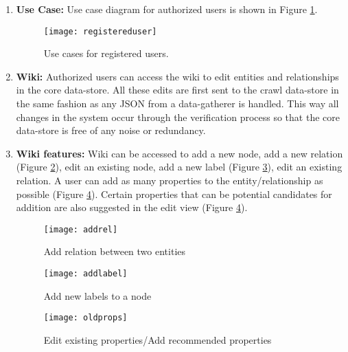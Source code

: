 \begin{enumerate}

\item \textbf{Use Case:} Use case diagram for authorized users is shown in Figure \ref{fig:registereduser}.

\begin{figure}[H]
\begin{center}  
\texttt{[image: registereduser]} 
\caption{Use cases for registered users.}
\label{fig:registereduser}
\end{center}
\end{figure}

\item \textbf{Wiki:} Authorized users can access the wiki to edit entities and relationships in the core data-store. All these edits are first sent to the crawl data-store in the same fashion as any JSON from a data-gatherer is handled. This way all changes in the system occur through the verification process so that the core data-store is free of any noise or redundancy. 


\item \textbf{Wiki features:} Wiki can be accessed to add a new node, add a  new relation (Figure \ref{fig:addrel}),  edit an existing node, add a new label (Figure \ref{fig:addlabel}), edit an existing relation. A user can add as many properties to the entity/relationship as possible (Figure \ref{fig:oldprops}). Certain properties that can be potential candidates for addition are also suggested in the edit view (Figure \ref{fig:oldprops}). 

\begin{figure}[H]
\begin{center}  
\texttt{[image: addrel]} 
\caption{Add relation between two entities}
\label{fig:addrel}
\end{center}
\end{figure}


\begin{figure}[H]
\begin{center}  
\texttt{[image: addlabel]} 
\caption{Add new labels to a node}
\label{fig:addlabel}
\end{center}
\end{figure}

\begin{figure}[H]
\begin{center}  
\texttt{[image: oldprops]} 
\caption{Edit existing properties/Add recommended properties}
\label{fig:oldprops}
\end{center}
\end{figure}



\end{enumerate}


